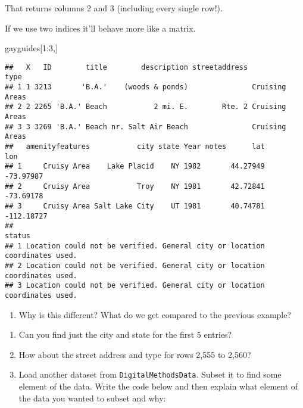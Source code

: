 \documentclass[
]{article}
\newenvironment{Shaded}{\begin{snugshade}}{\end{snugshade}}
\newcommand{\DecValTok}[1]{\textcolor[rgb]{0.00,0.00,0.81}{#1}}
\newcommand{\NormalTok}[1]{#1}
\newcommand{\SpecialCharTok}[1]{\textcolor[rgb]{0.00,0.00,0.00}{#1}}
\providecommand{\tightlist}{%
  \setlength{\itemsep}{0pt}\setlength{\parskip}{0pt}}
\begin{document}
That returns columns 2 and 3 (including every single row!).

If we use two indices it'll behave more like a matrix.

\begin{Shaded}
\begin{Highlighting}[]
\NormalTok{gayguides[}\DecValTok{1}\SpecialCharTok{:}\DecValTok{3}\NormalTok{,]}
\end{Highlighting}
\end{Shaded}

\begin{verbatim}
##   X   ID        title        description streetaddress           type
## 1 1 3213       'B.A.'    (woods & ponds)               Cruising Areas
## 2 2 2265 'B.A.' Beach           2 mi. E.        Rte. 2 Cruising Areas
## 3 3 3269 'B.A.' Beach nr. Salt Air Beach               Cruising Areas
##   amenityfeatures           city state Year notes      lat        lon
## 1     Cruisy Area    Lake Placid    NY 1982       44.27949  -73.97987
## 2     Cruisy Area           Troy    NY 1981       42.72841  -73.69178
## 3     Cruisy Area Salt Lake City    UT 1981       40.74781 -112.18727
##                                                                       status
## 1 Location could not be verified. General city or location coordinates used.
## 2 Location could not be verified. General city or location coordinates used.
## 3 Location could not be verified. General city or location coordinates used.
\end{verbatim}

\begin{enumerate}
\def\labelenumi{(\arabic{enumi})}
\setcounter{enumi}{6}
\tightlist
\item
  Why is this different? What do we get compared to the previous
  example?
\end{enumerate}

\begin{quote}
\end{quote}

\begin{enumerate}
\def\labelenumi{(\arabic{enumi})}
\setcounter{enumi}{7}
\item
  Can you find just the city and state for the first 5 entries?
\item
  How about the street address and type for rows 2,555 to 2,560?
\item
  Load another dataset from \texttt{DigitalMethodsData}. Subset it to
  find some element of the data. Write the code below and then explain
  what element of the data you wanted to subset and why:
\end{enumerate}
\end{document}
